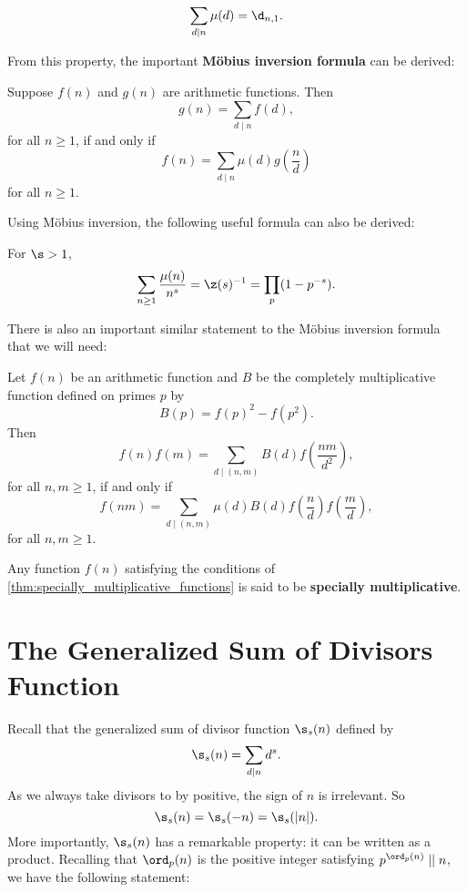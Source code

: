     \begin{proposition}\label{prop:Mobius_dirac_delta}
      \[
        \sum_{d \mid n}\mu(d) = \d_{n,1}.
      \]
    \end{proposition}

    From this property, the important \textbf{M\"obius inversion formula} can be derived:

    \begin{theorem}
      Suppose $f(n)$ and $g(n)$ are arithmetic functions. Then
      \[
        g(n) = \sum_{d \mid n}f(d),
      \]
      for all $n \ge 1$, if and only if
      \[
        f(n) = \sum_{d \mid n}\mu(d)g\left(\frac{n}{d}\right)
      \]
      for all $n \ge 1$.
    \end{theorem}

    Using M\"obius inversion, the following useful formula can also be derived:

    \begin{proposition}\label{prop:Dirichlet_Mobius_is_zeta_inverse}
      For $\s > 1$,
      \[
        \sum_{n \ge 1}\frac{\mu(n)}{n^{s}} = \z(s)^{-1} = \prod_{p}(1-p^{-s}).
      \]
    \end{proposition}

    There is also an important similar statement to the M\"obius inversion formula that we will need:

    \begin{theorem}\label{thm:specially_multiplicative_functions}
      Let $f(n)$ be an arithmetic function and $B$ be the completely multiplicative function defined on primes $p$ by
      \[
        B(p) = f(p)^{2}-f(p^{2}).
      \]
      Then
      \[
        f(n)f(m) = \sum_{d \mid (n,m)}B(d)f\left(\frac{nm}{d^{2}}\right),
      \]
      for all $n,m \ge 1$, if and only if
      \[
        f(nm) = \sum_{d \mid (n,m)}\mu(d)B(d)f\left(\frac{n}{d}\right)f\left(\frac{m}{d}\right),
      \]
      for all $n,m \ge 1$.
    \end{theorem}

    Any function $f(n)$ satisfying the conditions of \cref{thm:specially_multiplicative_functions} is said to be \textbf{specially multiplicative}.
  \section{The Generalized Sum of Divisors Function}
    Recall that the generalized sum of divisor function $\s_{s}(n)$ defined by
    \[
      \s_{s}(n) = \sum_{d \mid n}d^{s}.
    \]
    As we always take divisors to by positive, the sign of $n$ is irrelevant. So
    \[
      \s_{s}(n)  = \s_{s}(-n) = \s_{s}(|n|).
    \]
    More importantly, $\s_{s}(n)$ has a remarkable property: it can be written as a product. Recalling that $\ord_{p}(n)$ is the positive integer satisfying $p^{\ord_{p}(n)} \mid\mid n$, we have the following statement:

